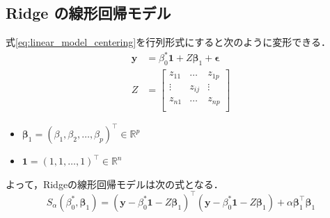 \documentclass[dvipdfmx, 10pt]{beamer}
\begin{document}
\subsection{Ridge の線形回帰モデル}
\begin{frame}{\insertsubsection}
    式\eqref{eq:linear_model_centering}を行列形式にすると次のように変形できる．
    \begin{equation}
	\begin{split}
		\bm{y} &= \beta_0^* \bm{1} + Z \bm{\beta}_1 + \bm{\epsilon}\\
		Z &= \left[
                \begin{array}{ccc}
                z_{11} & \dots & z_{1p} \\
                \vdots & z_{ij} & \vdots \\
                z_{n1} & \dots & z_{np} \\
                \end{array}
                \right]
        \end{split}
	\label{eq:linear_model_mat}
    \end{equation}
    \begin{itemize}
    	\item $\bm{\beta}_1 = (\beta_1, \beta_2, \dots , \beta_p)^{\top} \in \mathbb{R}^p$
	\item $ \bm{1} = (1, 1, \dots , 1)^{\top} \in \mathbb{R}^n$
    \end{itemize}
    \vspace{10pt}
    よって，Ridgeの線形回帰モデルは次の式となる．
    \begin{equation}
    	S_{\alpha}(\beta_0^* , \bm{\beta}_1) = (\bm{y} - \beta_0^* \bm{1} - Z \bm{\beta}_1)^{\top} (\bm{y} - \beta_0^* \bm{1} - Z \bm{\beta}_1) + \alpha \bm{\beta}_1^{\top} \bm{\beta}_1 
    	\label{eq:ridge_estimate}
    \end{equation}
\end{frame}
\end{document}
